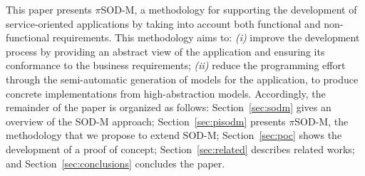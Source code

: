 %


This paper presents $\pi$SOD-M,  a methodology for supporting the development of service-oriented applications by taking into account both functional and non-functional requirements. This methodology aims to:
\textit{(i)} improve the development process by providing an abstract view of the application and ensuring its conformance to the business requirements;
\textit{(ii)} reduce the programming effort through the semi-automatic generation of  models for the application, to produce concrete implementations from high-abstraction models.
%
Accordingly, the remainder of the paper is organized as follows:
Section~\ref{sec:sodm}  gives an overview of the SOD-M approach;
Section~\ref{sec:pisodm} presents $\pi$SOD-M, the methodology that we propose to extend SOD-M;
Section~\ref{sec:poc} shows the development of a proof of concept;
Section~\ref{sec:related} describes related works; and
Section~\ref{sec:conclusions} concludes the paper. %

